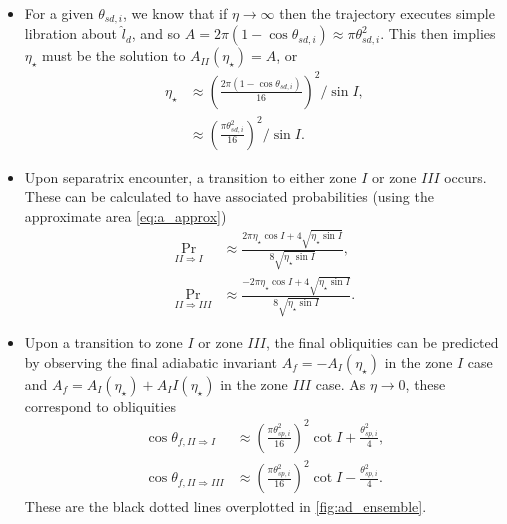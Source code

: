 \documentclass[
        fleqn,
        usenatbib,
    ]{mnras}
\newcommand*{\p}[1]{\left(#1\right)}
\begin{document}
\begin{itemize}
    \item For a given $\theta_{sd, i}$, we know that if $\eta \to \infty$ then
        the trajectory executes simple libration about $\hat{l}_d$, and so $A =
        2\pi\p{1 - \cos \theta_{sd, i}} \approx \pi \theta_{sd, i}^2$. This
        then implies $\eta_\star$ must be the solution to $A_{II}(\eta_\star) =
        A$, or
        \begin{align}
            \eta_\star &\approx \p{\frac{2\pi\p{1 - \cos \theta_{sd,i}}}{
                        16}}^2 / \sin I,\nonumber\\
                    &\approx \p{\frac{\pi \theta_{sd, i}^2}{16}}^2/\sin I.
        \end{align}

    \item Upon separatrix encounter, a transition to either zone $I$ or zone
        $III$ occurs. These can be calculated to have associated probabilities
        (using the approximate area \autoref{eq:a_approx})
        \begin{align}
            \Pr_{II \Rightarrow I} &\approx \frac{2\pi
                \eta_{\star} \cos I + 4\sqrt{\eta_{\star}\sin
                I}}{8\sqrt{\eta_{\star}\sin I}},\\
            \Pr_{II \Rightarrow III} &\approx \frac{-2\pi
                \eta_{\star} \cos I + 4\sqrt{\eta_{\star}\sin
                I}}{8\sqrt{\eta_{\star}\sin I}}.
        \end{align}

    \item Upon a transition to zone $I$ or zone $III$, the final obliquities can be
        predicted by observing the final adiabatic invariant $A_f =
        -A_I(\eta_\star)$ in the zone $I$ case and $A_f = A_I(\eta_\star) +
        A_II(\eta_\star)$ in the zone $III$ case. As $\eta \to 0$, these
        correspond to obliquities
        \begin{align}
            \cos \theta_{f, II \Rightarrow I} &\approx
                \p{\frac{\pi \theta_{sp, i}^2}{16}}^2 \cot I
                    + \frac{\theta_{sp, i}^2}{4},\\
            \cos \theta_{f, II \Rightarrow III} &\approx
                \p{\frac{\pi \theta_{sp, i}^2}{16}}^2 \cot I
                    - \frac{\theta_{sp, i}^2}{4}.
        \end{align}
        These are the black dotted lines overplotted in
        \autoref{fig:ad_ensemble}.
\end{itemize}
\end{document}
